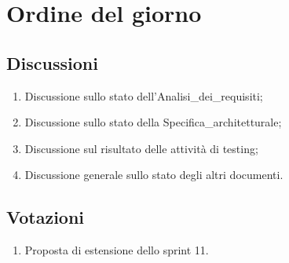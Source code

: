 \section{Ordine del giorno} \label{sec:agenda}
\subsection{Discussioni} \label{subsec:discussione}
\begin{enumerate}
    \item Discussione sullo stato dell'Analisi\_dei\_requisiti;
    \item Discussione sullo stato della Specifica\_architetturale;
    \item Discussione sul risultato delle attività di testing;
    \item Discussione generale sullo stato degli altri documenti.
\end{enumerate}

\subsection{Votazioni} \label{subsec:votazione}
\begin{enumerate}
    \item Proposta di estensione dello sprint 11.
\end{enumerate}